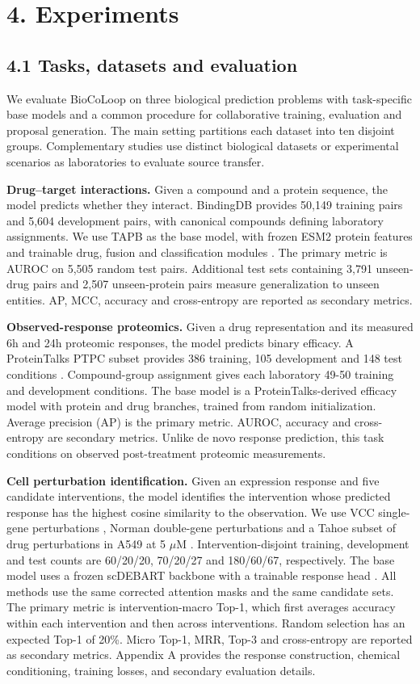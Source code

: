 \section*{4. Experiments}
\subsection*{4.1 Tasks, datasets and evaluation}
We evaluate BioCoLoop on three biological prediction problems with task-specific base models and a common procedure for collaborative training, evaluation and proposal generation. The main setting partitions each dataset into ten disjoint groups. Complementary studies use distinct biological datasets or experimental scenarios as laboratories to evaluate source transfer.

\textbf{Drug--target interactions.}
Given a compound and a protein sequence, the model predicts whether they interact. BindingDB provides 50,149 training pairs and 5,604 development pairs, with canonical compounds defining laboratory assignments. We use TAPB as the base model, with frozen ESM2 protein features and trainable drug, fusion and classification modules \citep{lin2025tapb}. The primary metric is AUROC on 5,505 random test pairs. Additional test sets containing 3,791 unseen-drug pairs and 2,507 unseen-protein pairs measure generalization to unseen entities. AP, MCC, accuracy and cross-entropy are reported as secondary metrics.

\textbf{Observed-response proteomics.}
Given a drug representation and its measured 6h and 24h proteomic responses, the model predicts binary efficacy. A ProteinTalks PTPC subset provides 386 training, 105 development and 148 test conditions \citep{Sun2026ProteinTalks}. Compound-group assignment gives each laboratory 49-50 training and development conditions. The base model is a ProteinTalks-derived efficacy model with protein and drug branches, trained from random initialization. Average precision (AP) is the primary metric. AUROC, accuracy and cross-entropy are secondary metrics. Unlike de novo response prediction, this task conditions on observed post-treatment proteomic measurements.

\textbf{Cell perturbation identification.}
Given an expression response and five candidate interventions, the model identifies the intervention whose predicted response has the highest cosine similarity to the observation. We use VCC single-gene perturbations \citep{arc2025vcc}, Norman double-gene perturbations \citep{norman2019genetic} and a Tahoe subset of drug perturbations in A549 at 5 $\mu$M \citep{zhang2025tahoe}. Intervention-disjoint training, development and test counts are 60/20/20, 70/20/27 and 180/60/67, respectively. The base model uses a frozen scDEBART backbone with a trainable response head \citep{sung2026scdebart}. All methods use the same corrected attention masks and the same candidate sets. The primary metric is intervention-macro Top-1, which first averages accuracy within each intervention and then across interventions. Random selection has an expected Top-1 of 20\%. Micro Top-1, MRR, Top-3 and cross-entropy are reported as secondary metrics. Appendix A provides the response construction, chemical conditioning, training losses, and secondary evaluation details.


